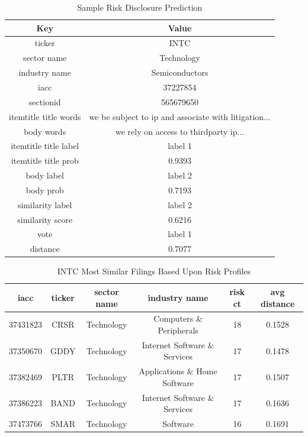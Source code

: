 \documentclass[11pt]{article}
\begin{document}
\begin{table}[h]
\centering
\begin{tabular}{ c | c }
  \hline
  Key & Value\\
  \hline    
  ticker & INTC \\
  sector name & Technology \\
  industry name & Semiconductors \\
  iacc & 37227854 \\
  sectionid & 565679650 \\                
  itemtitle title words & we be subject to ip and associate with litigation... \\
  body words & we rely on access to thirdparty ip...  \\
  itemtitle title label & label 1\\
  itemtitle title prob & 0.9393\\
  body label & label 2\\
  body prob & 0.7193\\
  similarity label & label 2\\
  similarity score & 0.6216\\
  vote & label 1\\
  distance & 0.7077\\
  \hline
\end{tabular}
\caption{Sample Risk Disclosure Prediction}
\label{tbl:sample_disclosure}
\end{table}

\begin{table}[h]
\centering
\begin{adjustbox}{width=\columnwidth,center}
\begin{tabular}{ c | c | c | c | c | c }
  \hline
  iacc & ticker & sector name & industry name & risk ct & avg distance\\
  \hline
  37431823 & CRSR & Technology & Computers \& Peripherals & 18 & 0.1528 \\
  37350670 & GDDY & Technology & Internet Software \& Services & 17 & 0.1478 \\
  37382469 & PLTR & Technology & Applications \& Home Software & 17 & 0.1507 \\
  37386223 & BAND & Technology & Internet Software \& Services & 17 & 0.1636 \\
  37473766 & SMAR & Technology & Software & 16 & 0.1691 \\
  
  \hline
\end{tabular}
\end{adjustbox}
\caption{INTC Most Similar Filings Based Upon Risk Profiles}
\label{tbl:sample_disclosure}
\end{table}
\end{document}
